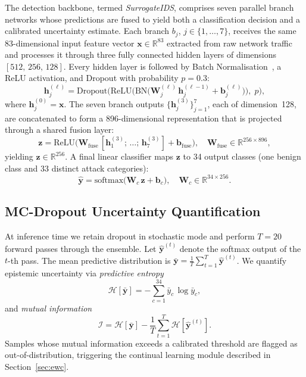\documentclass[journal,twoside]{IEEEtran}
\begin{document}
The detection backbone, termed \textit{SurrogateIDS}, comprises seven
parallel branch networks whose predictions are fused to yield both a
classification decision and a calibrated uncertainty estimate.  Each branch
$b_j$, $j\in\{1,\dots,7\}$, receives the same 83-dimensional input feature
vector $\mathbf{x}\in\mathbb{R}^{83}$ extracted from raw network traffic and
processes it through three fully connected hidden layers of dimensions
$[512,\,256,\,128]$.  Every hidden layer is followed by Batch
Normalisation~\cite{ioffe2015batch}, a ReLU activation, and Dropout with
probability $p=0.3$:
\begin{equation}
  \mathbf{h}_j^{(\ell)} = \mathrm{Dropout}\!\bigl(
    \mathrm{ReLU}\!\bigl(
      \mathrm{BN}\!\bigl(
        \mathbf{W}_j^{(\ell)}\,\mathbf{h}_j^{(\ell-1)}
        + \mathbf{b}_j^{(\ell)}
      \bigr)
    \bigr),\; p
  \bigr),
  \label{eq:branch}
\end{equation}
where $\mathbf{h}_j^{(0)}=\mathbf{x}$.  The seven branch outputs
$\{\mathbf{h}_j^{(3)}\}_{j=1}^{7}$, each of dimension~128, are
concatenated to form a 896-dimensional representation that is projected
through a shared fusion layer:
\begin{equation}
  \mathbf{z} = \mathrm{ReLU}\!\bigl(
    \mathbf{W}_{\mathrm{fuse}}\,
    [\mathbf{h}_1^{(3)};\,\dots;\,\mathbf{h}_7^{(3)}]
    + \mathbf{b}_{\mathrm{fuse}}
  \bigr),\quad
  \mathbf{W}_{\mathrm{fuse}}\in\mathbb{R}^{256\times 896},
  \label{eq:fusion}
\end{equation}
yielding $\mathbf{z}\in\mathbb{R}^{256}$.  A final linear classifier maps
$\mathbf{z}$ to 34 output classes (one benign class and 33 distinct attack
categories):
\begin{equation}
  \hat{\mathbf{y}} = \mathrm{softmax}\!\bigl(
    \mathbf{W}_c\,\mathbf{z} + \mathbf{b}_c
  \bigr),\quad
  \mathbf{W}_c\in\mathbb{R}^{34\times 256}.
  \label{eq:classifier}
\end{equation}

\subsection{MC-Dropout Uncertainty Quantification}
\label{sec:mcdropout}

At inference time we retain dropout in stochastic mode and perform
$T=20$ forward passes through the ensemble.  Let
$\hat{\mathbf{y}}^{(t)}$ denote the softmax output of the $t$-th pass.
The mean predictive distribution is
$\bar{\mathbf{y}}=\frac{1}{T}\sum_{t=1}^{T}\hat{\mathbf{y}}^{(t)}$.
We quantify epistemic uncertainty via \emph{predictive entropy}
\begin{equation}
  \mathcal{H}[\bar{\mathbf{y}}]
  = -\sum_{c=1}^{34}\bar{y}_c\,\log\bar{y}_c,
  \label{eq:pred_entropy}
\end{equation}
and \emph{mutual information}
\begin{equation}
  \mathcal{I}
  = \mathcal{H}[\bar{\mathbf{y}}]
    - \frac{1}{T}\sum_{t=1}^{T}\mathcal{H}[\hat{\mathbf{y}}^{(t)}].
  \label{eq:mi}
\end{equation}
Samples whose mutual information exceeds a calibrated threshold are
flagged as out-of-distribution, triggering the continual learning module
described in Section~\ref{sec:ewc}.
\end{document}

